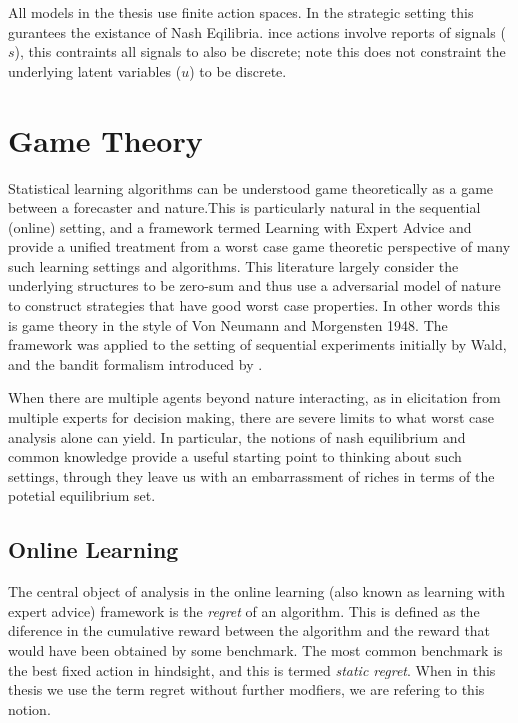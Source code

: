 
All models in the thesis use finite action spaces. In the strategic setting this gurantees the existance of Nash Eqilibria. 
ince actions involve reports of signals ($s$), this contraints all signals to also be discrete; note this does not constraint the underlying latent variables ($u$) to be discrete.



\section{Game Theory}

Statistical learning algorithms can be understood game theoretically as a game between a forecaster and nature.This is particularly natural in the sequential (online) setting, and a framework termed Learning with Expert Advice and \cite{cesa2006prediction} provide a unified treatment from a worst case game theoretic perspective of many such learning settings and algorithms.
This literature largely consider the underlying structures to be zero-sum and thus use a adversarial model of nature to construct strategies that have good worst case properties. In other words this is game theory in the style of Von Neumann and Morgensten 1948. The framework was applied to the setting of sequential experiments initially by Wald, and the bandit formalism introduced by \cite{robbins1952some}.

When there are multiple agents beyond nature interacting, as in elicitation from multiple experts for decision making, there are severe limits to what worst case analysis alone can yield. 
In particular, the notions of nash equilibrium \cite{nash1950equilibrium} and common knowledge \cite{aumann1976agreeing} provide a useful starting point to thinking about such settings, through they leave us with an embarrassment of riches in terms of the potetial equilibrium set.



\subsection{Online Learning}


The central object of analysis in the online learning (also known as learning with expert advice) framework is the \emph{regret} of an algorithm. This is defined as the diference in the cumulative reward between the algorithm and the reward that would have been obtained by some benchmark. 
The most common benchmark is the best fixed action in hindsight, and this is termed \emph{static regret}. When in this thesis we use the term regret without further modfiers, we are refering to this notion.

